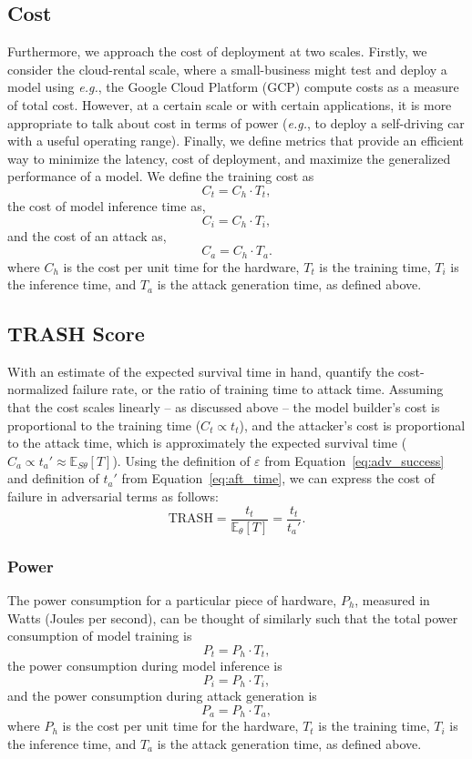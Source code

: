 \documentclass[sn-mathphys-num]{sn-jnl}%
\begin{document}
\subsection{Cost}

Furthermore, we approach the cost of deployment at two scales. Firstly, we consider the cloud-rental scale, where a small-business might test and deploy a model using \textit{e.g.}, the Google Cloud Platform (GCP) compute costs as a measure of total cost. However, at a certain scale or with certain applications, it is  more appropriate to talk about cost in terms of power (\textit{e.g.}, to deploy a self-driving car with a useful operating range). Finally, we define metrics that provide an efficient way to minimize the latency, cost of deployment, and
maximize the generalized performance of a model. We define the training cost as
\[
    C_t = C_h \cdot T_t,
\]
the cost of model inference time as,
\[
    C_i = C_h \cdot T_i,
\]
and the cost of an attack as,
\[
    C_a = C_h \cdot T_a.
\]
where $C_h$ is the cost per unit time for the hardware, $T_t$ is the training time, $T_i$ is the inference time, and $T_a$ is the attack generation time, as defined above.

\subsection{TRASH Score}
With an estimate of the expected survival time in hand,  quantify the cost-normalized failure rate, or the ratio of training time to attack time. Assuming that the cost scales linearly -- as discussed above -- the model builder's cost is proportional to the training time ($C_t \propto t_{t}$), and the attacker's cost is proportional to the attack time, which is approximately the expected survival time ($C_{a} \propto t_{a}' \approx \mathbb{E}_{S\theta}[T]$). Using the definition of $\varepsilon$ from Equation~\ref{eq:adv_success} and definition of $t_a'$ from Equation~\ref{eq:aft_time}, we can express the cost of failure in adversarial terms as follows:
\begin{equation}
	\textrm{TRASH}=\frac{t_t}{\mathbb{E}_{\theta}[T]} = \frac{t_t}{t_a'}.
	\label{eq:cost}
\end{equation}

\subsubsection{Power}

The power consumption for a particular piece of hardware, $P_h$, measured in Watts (Joules per second), can be thought of similarly such that the total power consumption of model training is
\[
    P_t = P_h \cdot T_t,
    \label{eq:power_training}
\]
the power consumption during model inference is
\[
    P_i = P_h \cdot T_i,
    \label{eq:power_inference}
\]
and the power consumption during attack generation is
\[
    P_a = P_h \cdot T_a,
    \label{eq:power_attack}
\]
where $P_h$ is the cost per unit time for the hardware, $T_t$ is the training time, $T_i$ is the inference time, and $T_a$ is the attack generation time, as defined above.
\end{document}
